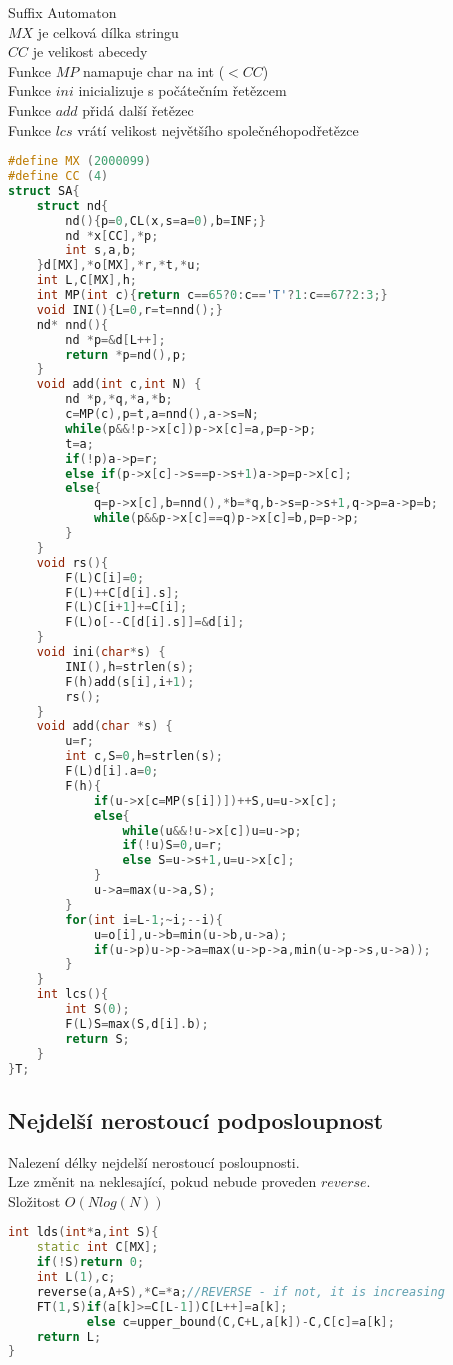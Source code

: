 \documentclass[11pt]{article}
\begin{document}
Suffix Automaton
\\$MX$ je celková dílka stringu
\\$CC$ je velikost abecedy
\\Funkce $MP$ namapuje char na int ($< CC$)
\\Funkce $ini$ inicializuje s počátečním řetězcem
\\Funkce $add$ přidá další řetězec
\\Funkce $lcs$ vrátí velikost největšího společnéhopodřetězce
\begin{lstlisting}[language=C++]
#define MX (2000099)
#define CC (4)
struct SA{
    struct nd{
        nd(){p=0,CL(x,s=a=0),b=INF;}
        nd *x[CC],*p;
        int s,a,b;
    }d[MX],*o[MX],*r,*t,*u;
    int L,C[MX],h;
    int MP(int c){return c==65?0:c=='T'?1:c==67?2:3;}
    void INI(){L=0,r=t=nnd();}
    nd* nnd(){
        nd *p=&d[L++];
        return *p=nd(),p;
    }
    void add(int c,int N) {
        nd *p,*q,*a,*b;
        c=MP(c),p=t,a=nnd(),a->s=N;
        while(p&&!p->x[c])p->x[c]=a,p=p->p;
        t=a;
        if(!p)a->p=r;
        else if(p->x[c]->s==p->s+1)a->p=p->x[c];
        else{
            q=p->x[c],b=nnd(),*b=*q,b->s=p->s+1,q->p=a->p=b;
            while(p&&p->x[c]==q)p->x[c]=b,p=p->p;
        }
    }
    void rs(){
        F(L)C[i]=0;
        F(L)++C[d[i].s];
        F(L)C[i+1]+=C[i];
        F(L)o[--C[d[i].s]]=&d[i];
    }
    void ini(char*s) {
        INI(),h=strlen(s);
        F(h)add(s[i],i+1);
        rs();
    }
    void add(char *s) {
        u=r;
        int c,S=0,h=strlen(s);
        F(L)d[i].a=0;
        F(h){
            if(u->x[c=MP(s[i])])++S,u=u->x[c];
            else{
                while(u&&!u->x[c])u=u->p;
                if(!u)S=0,u=r;
                else S=u->s+1,u=u->x[c];
            }
            u->a=max(u->a,S);
        }
        for(int i=L-1;~i;--i){
            u=o[i],u->b=min(u->b,u->a);
            if(u->p)u->p->a=max(u->p->a,min(u->p->s,u->a));
        }
    }
    int lcs(){
        int S(0);
        F(L)S=max(S,d[i].b);
        return S;
    }
}T;
\end{lstlisting}
\subsection{Nejdelší nerostoucí podposloupnost}
Nalezení délky nejdelší nerostoucí posloupnosti.
\\Lze změnit na neklesající, pokud nebude proveden $reverse$.
\\Složitost $O(Nlog(N))$
\begin{lstlisting}[language=C++]
int lds(int*a,int S){
    static int C[MX];
    if(!S)return 0;
    int L(1),c;
    reverse(a,A+S),*C=*a;//REVERSE - if not, it is increasing
    FT(1,S)if(a[k]>=C[L-1])C[L++]=a[k];
           else c=upper_bound(C,C+L,a[k])-C,C[c]=a[k];
    return L;
}
\end{lstlisting}
\end{document}
